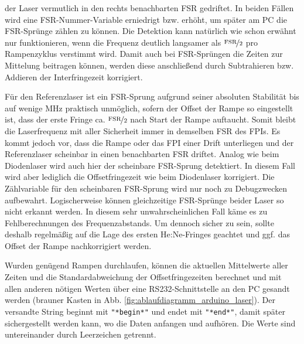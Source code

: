 der Laser vermutlich in den rechts benachbarten FSR gedriftet. In
beiden Fällen wird eine FSR-Nummer-Variable erniedrigt bzw. erhöht, um später am
PC die FSR-Sprünge zählen zu können. Die Detektion kann natürlich wie schon
erwähnt nur funktionieren, wenn die Frequenz deutlich langsamer als
$\nicefrac{\text{FSR}}{2}$ pro Rampenzyklus verstimmt wird. Damit auch bei
FSR-Sprüngen die Zeiten zur Mittelung beitragen können, werden diese
anschließend durch Subtrahieren bzw. Addieren der Interfringezeit korrigiert.\par
Für den Referenzlaser ist ein FSR-Sprung aufgrund seiner absoluten Stabilität
bis auf wenige MHz praktisch unmöglich, sofern der Offset der Rampe so
eingestellt ist, dass der erste Fringe ca.
$\nicefrac{\text{FSR}}{2}$ nach Start der Rampe auftaucht. Somit bleibt die
Laserfrequenz mit aller Sicherheit immer in demselben FSR des FPIs. Es
kommt jedoch vor, dass die Rampe oder das FPI einer Drift unterliegen
und der Referenzlaser scheinbar in einen benachbarten FSR driftet.
Analog wie beim Diodenlaser wird auch hier der scheinbare FSR-Sprung
detektiert. In diesem Fall wird aber lediglich die Offsetfringezeit wie beim
Diodenlaser korrigiert. Die Zählvariable für den scheinbaren FSR-Sprung
wird nur noch zu Debugzwecken aufbewahrt. Logischerweise können
gleichzeitige FSR-Sprünge beider Laser so nicht erkannt werden. In diesem
sehr unwahrscheinlichen Fall käme es zu Fehlberechnungen des Frequenzabstands.
Um dennoch sicher zu sein, sollte deshalb regelmäßig auf die Lage des ersten
He:Ne-Fringes geachtet und ggf. das Offset der Rampe nachkorrigiert werden.\par
Wurden genügend Rampen durchlaufen, können die aktuellen Mittelwerte aller
Zeiten und die Standardabweichung der Offsetfringezeiten berechnet und mit allen
anderen nötigen Werten über eine RS232-Schnittstelle an den PC gesandt werden
(brauner Kasten in Abb.
\ref{fig:ablaufdiagramm_arduino_laser}). Der versandte String beginnt
mit \lstinline|"*begin*"| und endet mit \lstinline|"*end*"|, damit später
sichergestellt werden kann, wo die Daten anfangen und aufhören. Die Werte sind
untereinander durch Leerzeichen getrennt.

